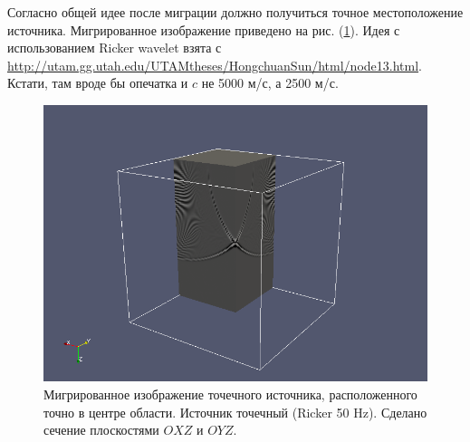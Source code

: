 \documentclass{article}
\begin{document}
Согласно общей идее после миграции должно получиться точное местоположение источника. Мигрированное изображение приведено на рис. (\ref{img_migrated_ricker}).
Идея с использованием Ricker wavelet взята с \url{http://utam.gg.utah.edu/UTAMtheses/HongchuanSun/html/node13.html}. Кстати, там вроде бы опечатка и $c$ не 5000 м/с, а 2500 м/с.
\begin{figure}[ht]
  \center
  \includegraphics[scale=0.5]{pic/point_source_output_1000_1000_1000.png}
  \caption{Мигрированное изображение точечного источника, расположенного точно в центре области. Источник точечный (Ricker 50 Hz). Сделано сечение плоскостями $OXZ$ и $OYZ$.}
\label{img_migrated_ricker}
\end{figure}
\end{document}
